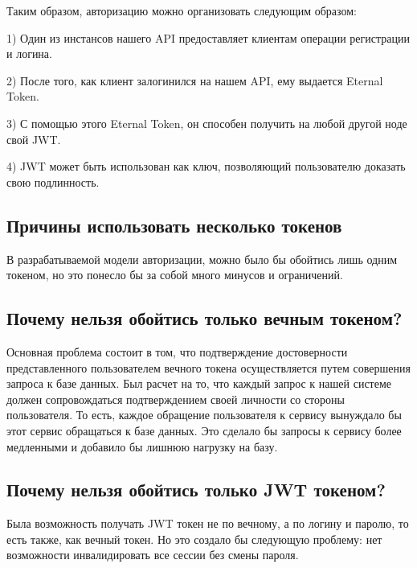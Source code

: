\documentclass[14pt]{extarticle}
\begin{document}
    Таким образом, авторизацию можно организовать следующим образом:

    1) Один из инстансов нашего API предоставляет клиентам операции регистрации и логина.

    2) После того, как клиент залогинился на нашем API, ему выдается Eternal Token.

    3) С помощью этого Eternal Token, он способен получить на любой другой ноде свой JWT.

    4) JWT может быть использован как ключ, позволяющий пользователю доказать свою подлинность.

    \subsection{Причины использовать несколько токенов}

    В разрабатываемой модели авторизации, можно было бы обойтись лишь одним токеном, но это
    понесло бы за
    собой много минусов и ограничений.

    \subsection{Почему нельзя обойтись только вечным токеном?}

    Основная проблема состоит в том, что подтверждение достоверности представленного пользователем вечного токена
    осуществляется путем совершения запроса к базе данных. Был расчет на то, что каждый запрос к нашей системе
    должен сопровождаться подтверждением своей личности со стороны пользователя. То есть, каждое обращение
    пользователя к сервису вынуждало бы этот сервис обращаться к базе данных. Это сделало бы запросы к сервису более
    медленными и добавило бы лишнюю нагрузку на базу.

    \subsection{Почему нельзя обойтись только JWT токеном?}

    Была возможность получать JWT токен не по вечному, а по логину и паролю, то есть также, как вечный токен. Но это
    создало бы следующую проблему: нет возможности инвалидировать все сессии без смены пароля.
\end{document}
